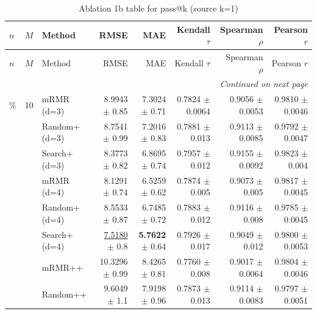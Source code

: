 \footnotesize
\setlength{\tabcolsep}{2pt}
\renewcommand{\arraystretch}{1.05}
\setlength{\LTpre}{0pt}
\setlength{\LTpost}{0pt}
\setlength{\LTleft}{\fill}
\setlength{\LTright}{\fill}
\begin{longtable}{llp{}rrrrr}
\caption{Ablation 1b table for pass@k (source k=1)}\label{tab:ablation\_1b\_passk\_k1}\\
\toprule
$n$ & $M$ & Method & RMSE & MAE & Kendall $\tau$ & Spearman $\rho$ & Pearson $r$ \\
\midrule
\endfirsthead
\toprule
$n$ & $M$ & Method & RMSE & MAE & Kendall $\tau$ & Spearman $\rho$ & Pearson $r$ \\
\midrule
\endhead
\midrule
\multicolumn{8}{r}{\emph{Continued on next page}} \\
\midrule
\endfoot
\bottomrule
\endlastfoot
5\% & 10 & mRMR (d=3) & 8.9943 {\scriptsize $\pm$ 0.85} & 7.3024 {\scriptsize $\pm$ 0.71} & 0.7824 {\scriptsize $\pm$ 0.0064} & 0.9056 {\scriptsize $\pm$ 0.0053} & 0.9810 {\scriptsize $\pm$ 0.0046} \\
 &  & Random+ (d=3) & 8.7541 {\scriptsize $\pm$ 0.99} & 7.2016 {\scriptsize $\pm$ 0.83} & 0.7881 {\scriptsize $\pm$ 0.013} & 0.9113 {\scriptsize $\pm$ 0.0085} & 0.9792 {\scriptsize $\pm$ 0.0047} \\
 &  & Search+ (d=3) & 8.3773 {\scriptsize $\pm$ 0.82} & 6.8695 {\scriptsize $\pm$ 0.74} & 0.7957 {\scriptsize $\pm$ 0.012} & 0.9155 {\scriptsize $\pm$ 0.0092} & 0.9823 {\scriptsize $\pm$ 0.004} \\
 &  & mRMR (d=4) & 8.1291 {\scriptsize $\pm$ 0.74} & 6.5259 {\scriptsize $\pm$ 0.62} & 0.7874 {\scriptsize $\pm$ 0.005} & 0.9073 {\scriptsize $\pm$ 0.005} & 0.9817 {\scriptsize $\pm$ 0.0045} \\
 &  & Random+ (d=4) & 8.5533 {\scriptsize $\pm$ 0.87} & 6.7485 {\scriptsize $\pm$ 0.72} & 0.7883 {\scriptsize $\pm$ 0.012} & 0.9116 {\scriptsize $\pm$ 0.008} & 0.9785 {\scriptsize $\pm$ 0.0045} \\
 &  & Search+ (d=4) & \underline{7.5180} {\scriptsize $\pm$ 0.8} & \textbf{5.7622} {\scriptsize $\pm$ 0.64} & 0.7926 {\scriptsize $\pm$ 0.017} & 0.9049 {\scriptsize $\pm$ 0.012} & 0.9800 {\scriptsize $\pm$ 0.0053} \\
 &  & mRMR++ & 10.3296 {\scriptsize $\pm$ 0.99} & 8.4265 {\scriptsize $\pm$ 0.81} & 0.7760 {\scriptsize $\pm$ 0.008} & 0.9017 {\scriptsize $\pm$ 0.0064} & 0.9804 {\scriptsize $\pm$ 0.0046} \\
 &  & Random++ & 9.6049 {\scriptsize $\pm$ 1.1} & 7.9198 {\scriptsize $\pm$ 0.96} & 0.7873 {\scriptsize $\pm$ 0.013} & 0.9114 {\scriptsize $\pm$ 0.0083} & 0.9797 {\scriptsize $\pm$ 0.0051} \\

\end{longtable}

